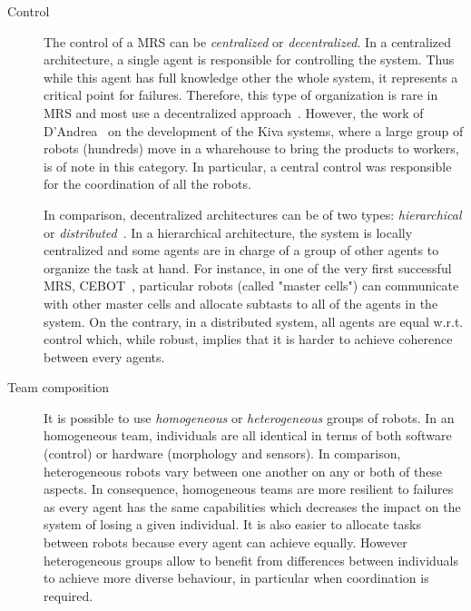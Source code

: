     \begin{description}
      \item[Control] {The control of a MRS can be \emph{centralized} or \emph{decentralized}. In a centralized architecture, a single agent is responsible for controlling the system. Thus while this agent has full knowledge other the whole system, it represents a critical point for failures. Therefore, this type of organization is rare in MRS and most use a decentralized approach~\parencite{Parker2008}. However, the work of D'Andrea~\parencite{DAndrea2012} on the development of the Kiva systems, where a large group of robots (hundreds) move in a wharehouse to bring the products to workers, is of note in this category. In particular, a central control was responsible for the coordination of all the robots. 

      In comparison, decentralized architectures can be of two types: \emph{hierarchical} or \emph{distributed}~\parencite{Cao1997}. In a hierarchical architecture, the system is locally centralized and some agents are in charge of a group of other agents to organize the task at hand. For instance, in one of the very first successful MRS, CEBOT~\parencite{Fukuda1988}, particular robots (called "master cells") can communicate with other master cells and allocate subtasts to all of the agents in the system. On the contrary, in a distributed system, all agents are equal w.r.t. control which, while robust, implies that it is harder to achieve coherence between every agents.}

      \item[Team composition] {It is possible to use \emph{homogeneous} or \emph{heterogeneous} groups of robots. In an homogeneous team, individuals are all identical in terms of both software (control) or hardware (morphology and sensors). In comparison, heterogeneous robots vary between one another on any or both of these aspects. In consequence, homogeneous teams are more resilient to failures as every agent has the same capabilities which decreases the impact on the system of losing a given individual. It is also easier to allocate tasks between robots because every agent can achieve equally. However heterogeneous groups allow to benefit from differences between individuals to achieve more diverse behaviour, in particular when coordination is required.}


\end{description}
